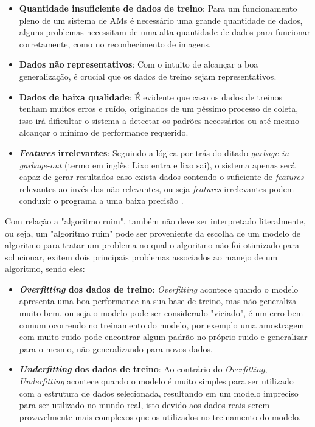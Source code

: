 \begin{itemize}
    \item \textbf{Quantidade insuficiente de dados de treino}: Para um funcionamento pleno de um sistema de AMs é necessário uma grande quantidade de dados, alguns problemas necessitam de uma alta quantidade de dados para funcionar corretamente, como no reconhecimento de imagens.
    \item \textbf{Dados não representativos}: Com o intuito de alcançar a boa generalização, é crucial que os dados de treino sejam representativos.
    \item \textbf{Dados de baixa qualidade}: É evidente que caso os dados de treinos tenham muitos erros e ruído, originados de um péssimo processo de coleta, isso irá dificultar o sistema a detectar os padrões necessários ou até mesmo alcançar o mínimo de performance requerido.
    \item \textbf{\textit{Features}  irrelevantes}: Seguindo a lógica por trás do ditado \textit{garbage-in garbage-out} (termo em inglês: Lixo entra e lixo sai), o sistema apenas será capaz de gerar resultados caso exista dados contendo o suficiente de \textit{features} relevantes ao invés das não relevantes, ou seja \textit{features} irrelevantes podem conduzir o programa a uma baixa precisão .
\end{itemize}

Com relação a "algoritmo ruim", também não deve ser interpretado literalmente, ou seja, um "algoritmo ruim" pode ser proveniente da escolha de um modelo de algoritmo para tratar um problema no qual o algoritmo não foi otimizado para solucionar, exitem dois principais problemas associados ao manejo de um algoritmo, sendo eles:

\begin{itemize}
    \item \textbf{\textit{Overfitting} dos dados de treino}: \textit{Overfitting} acontece quando o modelo apresenta uma boa performance na sua base de treino, mas não generaliza muito bem, ou seja o modelo pode ser considerado "viciado", é um erro bem comum ocorrendo no treinamento do modelo, por exemplo uma amostragem com muito ruido pode encontrar algum padrão no próprio ruido e generalizar para o mesmo, não generalizando para novos dados.
    \item \textbf{\textit{Underfitting} dos dados de treino}: Ao contrário do \textit{Overfitting}, \textit{Underfitting} acontece quando o modelo é muito simples para ser utilizado com a estrutura de dados selecionada, resultando em um modelo impreciso para ser utilizado no mundo real, isto devido aos dados reais serem provavelmente mais complexos que os utilizados no treinamento do modelo.
\end{itemize}

